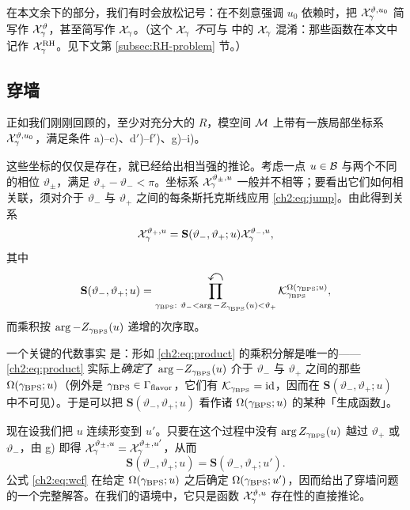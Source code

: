 在本文余下的部分，我们有时会放松记号：在不刻意强调 $u_0$ 依赖时，把 $\mathcal{X}_\gamma^{\vartheta, u_0}$ 简写作 $\mathcal{X}_\gamma^\vartheta$，甚至简写作 $\mathcal{X}_\gamma$。（这个 $\mathcal{X}_\gamma$ \emph{不}可与 \cite{Gaiotto:2008cd} 中的 $\mathcal{X}_\gamma$ 混淆：那些函数在本文中记作 $\mathcal{X}^{{\rm RH}}_\gamma$。见下文第 \ref{subsec:RH-problem} 节。）

\subsection{穿墙}
\label{subsec:wallcrossing}

正如我们刚刚回顾的，至少对充分大的 $R$，模空间 $\mathcal{M}$ 上带有一族局部坐标系 $\mathcal{X}^{\vartheta, u_0}_\gamma$，满足条件 a)–c)、d$'$)–f$'$)、g)–i)。

这些坐标的仅仅是存在，就已经给出相当强的推论。考虑一点 $u \in \mathcal{B}$ 与两个不同的相位 $\vartheta_\pm$，满足 $\vartheta_+ - \vartheta_- < \pi$。坐标系 $\mathcal{X}^{\vartheta_\pm, u}_\gamma$ 一般并不相等；要看出它们如何相关联，须对介于 $\vartheta_-$ 与 $\vartheta_+$ 之间的每条斯托克斯线应用 \eqref{ch2:eq:jump}。由此得到关系
\begin{equation} \label{ch2:eq:relate}
\mathcal{X}_{\gamma}^{\vartheta_+, u} = \mathbf{S}(\vartheta_-, \vartheta_+; u) \mathcal{X}_{\gamma}^{\vartheta_-, u},
\end{equation}
其中
\begin{equation} \label{ch2:eq:product}
\mathbf{S}(\vartheta_-, \vartheta_+; u) = \prod^{\text{\Large$\curvearrowleft$}}_{\gamma_{\rm BPS}: \ \vartheta_- < \arg -Z_{\gamma_{\rm BPS}}(u) < \vartheta_+} \mathcal{K}_{\gamma_{\rm BPS}}^{\Omega(\gamma_{\rm BPS}; u)},
\end{equation}
而乘积按 $\arg -Z_{\gamma_{\rm BPS}}(u)$ 递增的次序取。

一个关键的代数事实 \cite{ks1} 是：形如 \eqref{ch2:eq:product} 的乘积分解是唯一的——\eqref{ch2:eq:product} 实际上\emph{确定}了 $\arg -Z_{\gamma_{\rm BPS}}(u)$ 介于 $\vartheta_-$ 与 $\vartheta_+$ 之间的那些 $\Omega(\gamma_{\rm BPS}; u)$（例外是 $\gamma_{\rm BPS} \in \Gamma_{\rm flavor}$，它们有 $\mathcal{K}_{\gamma_{\rm BPS}} = \mathrm{id}$，因而在 $\mathbf{S}(\vartheta_-, \vartheta_+; u)$ 中不可见）。于是可以把 $\mathbf{S}(\vartheta_-, \vartheta_+; u)$ 看作诸 $\Omega(\gamma_{\rm BPS}; u)$ 的某种「生成函数」。

现在设我们把 $u$ 连续形变到 $u'$。只要在这个过程中没有 $\arg Z_{\gamma_{\rm BPS}}(u)$ 越过 $\vartheta_+$ 或 $\vartheta_-$，由 g) 即得 $\mathcal{X}_\gamma^{\vartheta_\pm, u} = \mathcal{X}_\gamma^{\vartheta_\pm, u'}$，从而
\begin{equation} \label{ch2:eq:wcf}
\mathbf{S}(\vartheta_-, \vartheta_+; u) = \mathbf{S}(\vartheta_-, \vartheta_+; u').
\end{equation}
公式 \eqref{ch2:eq:wcf} 在给定 $\Omega(\gamma_{\rm BPS}; u)$ 之后确定 $\Omega(\gamma_{\rm BPS}; u')$，因而给出了穿墙问题的一个完整解答。在我们的语境中，它只是函数 $\mathcal{X}^{\vartheta, u}_\gamma$ 存在性的直接推论。

